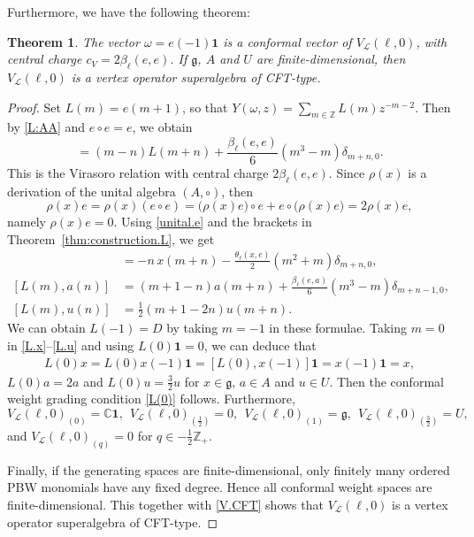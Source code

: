\documentclass[12pt]{article}
\numberwithin{equation}{section}
\newtheorem{theorem}{Theorem}[section]
\theoremstyle{definition}
\theoremstyle{plain}
\newcommand{\bC}{\ensuremath{\mathbb{C}}}
\newcommand{\bZ}{\ensuremath{\mathbb{Z}}}
\newcommand{\fg}{\mathfrak{g}}
\newcommand{\cL}{\ensuremath{\mathcal{L}}}
\newcommand{\bone}{\mathbf{1 }}
\begin{document}
Furthermore, we have the following theorem:
\begin{theorem}\label{thm:VOSA}
    The vector $\omega=e(-1)\bone$ is a conformal vector of $V_\cL(\ell,0)$, with central charge $c_V=2\beta_\ell(e,e)$. If $\fg$, $A$ and $U$ are finite-dimensional, then $V_\cL(\ell,0)$ is a vertex operator superalgebra of CFT-type.
\end{theorem}
\begin{proof}
    Set $L(m)=e(m+1)$, so that $Y(\omega,z)=\sum_{m\in\bZ}L(m)z^{-m-2}$. Then by \eqref{L:AA} and $e\circ e=e$, we obtain
    \begin{equation*}
        [L(m),L(n)]=(m-n)L(m+n)+\frac{\beta_\ell(e,e)}{6}(m^3-m)\delta_{m+n,0}.
    \end{equation*}
    This is the Virasoro relation with central charge $2\beta_\ell(e,e)$. Since $\rho(x)$ is a derivation of the unital algebra $(A,\circ)$, then
    \begin{equation}\label{rho(x)e}
        \rho(x)e=\rho(x)(e\circ e)=\big(\rho(x)e\big)\circ e+e\circ\big(\rho(x)e\big)=2\rho(x)e,
    \end{equation}
    namely $\rho(x)e=0$. Using \eqref{unital.e} and the brackets in Theorem~\ref{thm:construction.L}, we get
\begin{align}
    [L(m),x(n)]&=-n\,x(m+n)-\frac{\theta_\ell(x,e)}{2}(m^2+m)\delta_{m+n,0},\label{L.x}\\
    [L(m),a(n)]&=(m+1-n)a(m+n)+\frac{\beta_\ell(e,a)}{6}(m^3-m)\delta_{m+n-1,0},\label{L.a}\\
    [L(m),u(n)]&=\frac{1}{2}(m+1-2n)u(m+n).\label{L.u}
\end{align} 
We can obtain $L(-1)=D$ by taking $m=-1$ in these formulae. Taking $m=0$ in \eqref{L.x}--\eqref{L.u} and using $L(0)\bone=0$, we can deduce that
\begin{align*}
    L(0)x=L(0)x(-1)\bone=[L(0),x(-1)]\bone=x(-1)\bone=x,
\end{align*}
$L(0)a=2a$ and $L(0)u=\frac{3}{2}u$ for $x\in\fg$, $a\in A$ and $u\in U$. Then the conformal weight grading condition \eqref{L(0)} follows. Furthermore,
\begin{equation}\label{V.CFT}
    V_{\cL}(\ell,0)_{(0)}=\bC\bone,\ \ V_{\cL}(\ell,0)_{(\frac{1}{2})}=0,\ \ V_{\cL}(\ell,0)_{(1)}=\fg,\ \ V_{\cL}(\ell,0)_{(\frac{3}{2})}=U,
\end{equation}
and $V_{\cL}(\ell,0)_{(q)}=0$ for $q\in-\frac{1}{2}\bZ_+$. 

Finally, if the generating spaces are finite-dimensional, only finitely many ordered PBW monomials have any fixed degree. Hence all conformal weight spaces are finite-dimensional. This together with \eqref{V.CFT} shows that $V_\cL(\ell,0)$ is a vertex operator superalgebra of CFT-type.
\end{proof}
\end{document}
